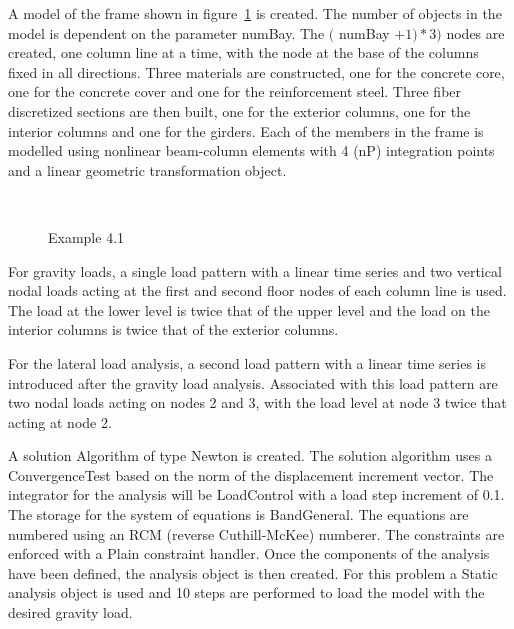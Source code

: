 \documentclass[12pt]{article}
\begin{document}
\vspace{0.2in} 

A model of the frame shown in figure~\ref{example4} is created. The
number of objects in the model is dependent on the parameter
numBay. The $($ numBay $+1)*3)$ nodes are 
created, one column line at a time, with the node at the base of the
columns fixed in all directions. Three materials are
constructed, one for the concrete core, one for the concrete cover and
one for the reinforcement steel. Three fiber discretized sections are
then built, one for the exterior columns, one for the interior columns
and one for the girders. Each of the members in the frame is modelled
using nonlinear beam-column elements with 4 (nP) integration points
and a linear geometric transformation object.

\begin{figure}[h]
\begin{center}
\leavevmode
\hbox{%
\epsfxsize=5.5in
}
\end{center}
\caption{Example 4.1}
\label{example4}
\end{figure}


For gravity loads, a single load pattern with a linear time series and two
vertical nodal loads acting at the first and second floor nodes of
each column line is used. The load at the lower level is twice that of the
upper level and the load on the interior columns is twice that of the
exterior columns.

For the lateral load analysis, a second load pattern
with a linear time series is introduced after the gravity load
analysis. Associated with this load pattern are two nodal loads acting
on nodes 2 and 3, with the load level at node 3 twice that acting at
node 2. 



\vspace{0.2in}

A solution Algorithm of type Newton is created. The solution
algorithm uses a ConvergenceTest based on the norm
of the displacement increment vector. The integrator for the analysis
will be LoadControl with a load step increment of 0.1. The storage for
the system of equations is BandGeneral. The equations are numbered
using an RCM (reverse Cuthill-McKee) numberer. The constraints are
enforced with a Plain constraint handler. Once the components of the
analysis have been defined, the analysis object is then created. For
this problem a Static analysis object is used and 10 steps
are performed to load the model with the desired gravity load.
\end{document}
